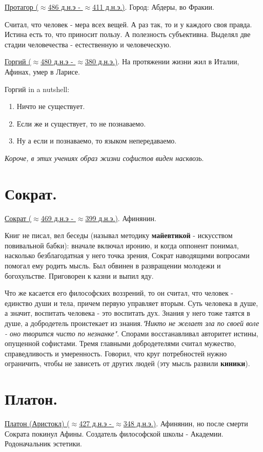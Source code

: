 \underline{Протагор ($\approx$486 д.н.э - $\approx$411 д.н.э.)}. Город: Абдеры, во Фракии.

Считал, что человек - мера всех вещей. А раз так, то и у каждого своя правда. Истина есть то, что приносит пользу. А полезность субъективна. Выделял две стадии человечества - естественную  и человеческую.

\underline{Горгий ($\approx$480 д.н.э - $\approx$380 д.н.э.)}. На протяжении жизни жил в Италии, Афинах, умер в Ларисе. 

Горгий in a nutshell:
\begin{enumerate}
\item Ничто не существует.
\item Если же и существует, то не познаваемо.
\item Ну а если и познаваемо, то языком непередаваемо.
\end{enumerate}

\textit{Короче, в этих учениях образ жизни софистов виден насквозь}.

\section{Сократ.}
\underline{Сократ ($\approx$469 д.н.э - $\approx$399 д.н.э.)}. Афинянин.

 Книг не писал, вел беседы (называл методику \textbf{майевтикой} - искусством повивальной бабки): вначале включал иронию, и когда оппонент понимал, насколько безблагодатная у него точка зрения, Сократ наводящими вопросами помогал ему родить мысль. Был обвинен в развращении молодежи и богохульстве. Приговорен к казни и выпил яду.

Что же касается его философских воззрений, то он считал, что человек - единство души и тела, причем первую управляет вторым. Суть человека в душе, а значит, воспитать человека - это воспитать дух. Знания у него тоже таятся в душе, а добродетель проистекает из знания.\textit{"Никто не желает зла по своей воле - оно творится чисто по незнанке"}. Спорами восстанавливал авторитет истины, опущенной софистами. 
Тремя главными добродетелями считал мужество, справедливость и умеренность. Говорил, что круг потребностей нужно ограничить, чтобы не зависеть от других людей (эту мысль развили \textbf{киники}).

\section{Платон.}
\underline{Платон (Аристокл) ($\approx$427 д.н.э - $\approx$348 д.н.э.)}. Афинянин, но после смерти Сократа покинул Афины. Создатель философской школы - Академии. Родоначальник эстетики.

